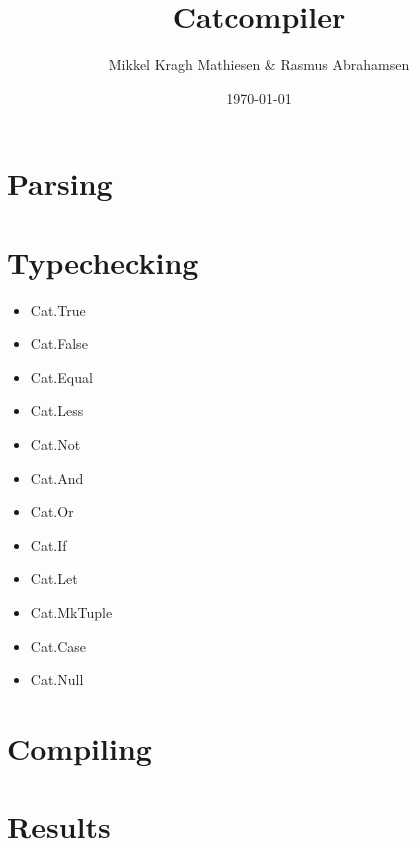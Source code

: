 \documentclass{article}
\author{Mikkel Kragh Mathiesen \& Rasmus Abrahamsen}
\title{Catcompiler}
\date{\today}
\begin{document}
\maketitle

\section{Parsing}

\section{Typechecking}

\begin{itemize}
	\item Cat.True
	\item Cat.False
	\item Cat.Equal
	\item Cat.Less
	\item Cat.Not
	\item Cat.And
	\item Cat.Or
	\item Cat.If
	\item Cat.Let
	\item Cat.MkTuple
	\item Cat.Case
	\item Cat.Null
\end{itemize}

\section{Compiling}

\section{Results}

\end{document}

